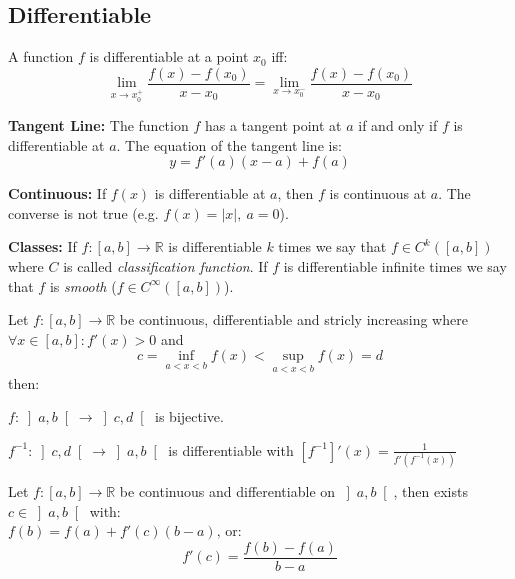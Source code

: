 \documentclass[8pt,a4paper]{extarticle}     %
\theoremstyle{definition}
\theoremstyle{definition}
\theoremstyle{definition}
\newcommand{\R}{\mathbb{R}}
\begin{document}
\begin{multicols}{4}
\subsection{Differentiable}
\begin{boxtheorem}[Differentiable]
	A function $f$ is differentiable at a point $x_0$ iff:
	$$\lim_{x \to x_{0}^+} \frac{f(x)-f(x_0)}{x-x_0} = \lim_{x \to x_{0}^-} \frac{f(x)-f(x_0)}{x-x_0}$$
\end{boxtheorem}
\begin{eqlist}
	\item \textbf{Tangent Line:} The function $f$ has a tangent point at $a$ if and only if $f$ is differentiable at $a$. The equation of the tangent line is:
	$$y = f'(a)(x-a)+f(a)$$
	\item \textbf{Continuous:} If $f(x)$ is differentiable at $a$, then $f$ is continuous at $a$. The converse is not true (e.g. $f(x) = |x|, \ a=0$).
	\item \textbf{Classes:} If $f:[a,b] \rightarrow \R$ is differentiable $k$ times we say that $f \in C^k([a,b])$ where $C$ is called \textit{classification function}. If $f$ is differentiable infinite times we say that $f$ is \textit{smooth} ($f \in C^\infty([a,b])$).
\end{eqlist}

\begin{boxtheorem}
	Let $f: [a,b] \longrightarrow \R$ be continuous, differentiable and stricly increasing where $\forall x\in[a,b]: f'(x)>0$ and $$c = \underset{a<x<b}{\inf} f(x) < \underset{a<x<b}{\sup} f(x) = d$$ then:
	\begin{bulletlist}
		\item $f:\left]a,b\right[\rightarrow\left]c,d\right[$ is bijective.
		\item $f^{-1}:\left]c,d\right[\rightarrow\left]a,b\right[$ is differentiable with $[f^{-1}]'(x) = \frac{1}{f'(f^{-1}(x))}$
	\end{bulletlist}
\end{boxtheorem}

\begin{boxtheorem}
	Let $f: [a,b] \longrightarrow \R$ be continuous and differentiable on $\left]a,b\right[$, then exists $c\in\left]a,b\right[$ with: \\
	$f(b) = f(a) + f'(c)(b-a) \text{, or:}$
	$$f'(c) = \frac{f(b)-f(a)}{b-a}$$
\end{boxtheorem}


\vfill\null
\columnbreak
\vfill\null
\columnbreak


\end{multicols}
\end{document}
